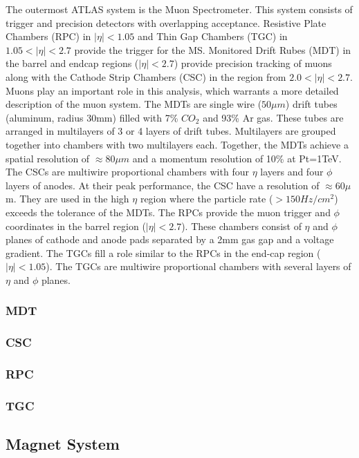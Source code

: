 The outermost ATLAS system is the Muon Spectrometer.
This system consists of trigger and precision detectors with overlapping acceptance.
Resistive Plate Chambers (RPC) in $|\eta|<1.05$ and Thin Gap Chambers (TGC) in $1.05<|\eta|<2.7$ provide the trigger for the MS.
Monitored Drift Rubes (MDT) in the barrel and endcap regions ($|\eta|<2.7$) provide precision tracking of muons along with the Cathode Strip Chambers (CSC) in the region from $2.0<|\eta|<2.7$.
Muons play an important role in this analysis, which warrants a more detailed description of the muon system.
The MDTs are single wire ($50\mu m$) drift tubes (aluminum, radius 30mm) filled with 7\% $CO_2$ and 93\% Ar gas.
These tubes are arranged in multilayers of 3 or 4 layers of drift tubes.
Multilayers are grouped together into chambers with two multilayers each.
Together, the MDTs achieve a spatial resolution of $\approx80\mu m$ and a momentum resolution of 10\% at Pt=1TeV.
The CSCs are multiwire proportional chambers with four $\eta$ layers and four $\phi$ layers of anodes.
At their peak performance, the CSC have a resolution of $\approx60\mu$m.
They are used in the high $\eta$ region where the particle rate ($>150 Hz/cm^2$) exceeds the tolerance of the MDTs.
The RPCs provide the muon trigger and $\phi$ coordinates in the barrel region ($|\eta|<2.7$).
These chambers consist of $\eta$ and $\phi$ planes of cathode and anode pads separated by a 2mm gas gap and a voltage gradient.
The TGCs fill a role similar to the RPCs in the end-cap region ($|\eta|<1.05$).
The TGCs are multiwire proportional chambers with several layers of $\eta$ and $\phi$ planes. \cite{det-muon}

\subsubsection{MDT} %
\subsubsection{CSC} %
\subsubsection{RPC}
\subsubsection{TGC}

\subsection{Magnet System}

